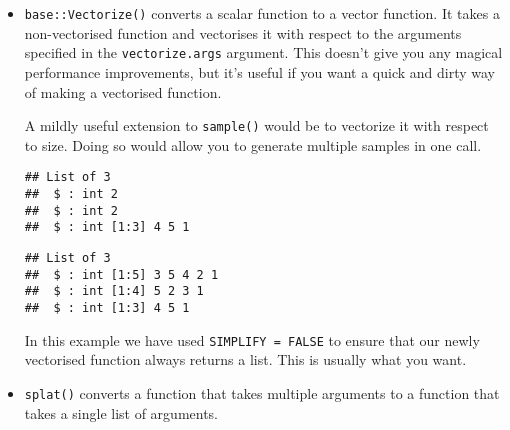 \begin{itemize}
\item
  \texttt{base::Vectorize()} converts a scalar function to a vector
  function. It takes a non-vectorised function and vectorises it with
  respect to the arguments specified in the \texttt{vectorize.args}
  argument. This doesn't give you any magical performance improvements,
  but it's useful if you want a quick and dirty way of making a
  vectorised function. 

  A mildly useful extension to \texttt{sample()} would be to vectorize
  it with respect to size. Doing so would allow you to generate multiple
  samples in one call. 

\begin{Shaded}
\begin{Highlighting}[]
\StringTok{ }\NormalTok{, } \NormalTok{)}
\NormalTok{(}\NormalTok{(}\OperatorTok{:}\NormalTok{, }\NormalTok{(}\NormalTok{, }\NormalTok{, }\NormalTok{)))}
\end{Highlighting}
\end{Shaded}

\begin{verbatim}
## List of 3
##  $ : int 2
##  $ : int 2
##  $ : int [1:3] 4 5 1
\end{verbatim}

\begin{Shaded}
\begin{Highlighting}[]
\NormalTok{(}\NormalTok{(}\OperatorTok{:}\NormalTok{, }\OperatorTok{:}\NormalTok{))}
\end{Highlighting}
\end{Shaded}

\begin{verbatim}
## List of 3
##  $ : int [1:5] 3 5 4 2 1
##  $ : int [1:4] 5 2 3 1
##  $ : int [1:3] 4 5 1
\end{verbatim}

  In this example we have used \texttt{SIMPLIFY\ =\ FALSE} to ensure
  that our newly vectorised function always returns a list. This is
  usually what you want.
\item
  \texttt{splat()} converts a function that takes multiple arguments to
  a function that takes a single list of arguments. 


\end{itemize}
